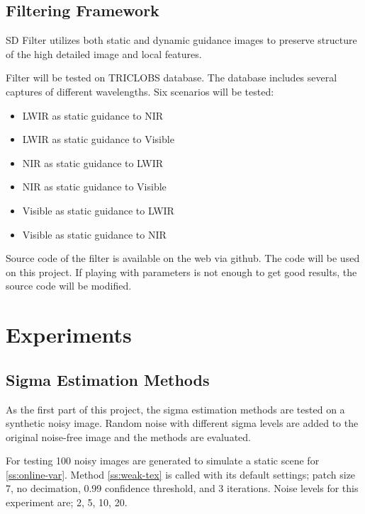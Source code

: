 \documentclass[10pt,twocolumn,letterpaper]{article}
\begin{document}
\subsection{Filtering Framework}
SD Filter\cite{ham2015} utilizes both static and dynamic guidance images to preserve structure of the high detailed image and local features.

Filter will be tested on TRICLOBS\cite{triclobs} database. The database includes several captures of different wavelengths. Six scenarios will be tested:
\begin{itemize}
	\item LWIR as static guidance to NIR
	\item LWIR as static guidance to Visible
	\item NIR as static guidance to LWIR
	\item NIR as static guidance to Visible
	\item Visible as static guidance to LWIR
	\item Visible as static guidance to NIR
\end{itemize}

Source code of the filter is available on the web via github\cite{github:sdfilter}. The code will be used on this project. If playing with parameters is not enough to get good results, the source code will be modified.

\section{Experiments}
\subsection{Sigma Estimation Methods}
As the first part of this project, the sigma estimation methods are tested on a synthetic noisy image. Random noise with different sigma levels are added to the original noise-free image and the methods are evaluated.

For testing 100 noisy images are generated to simulate a static scene for \ref{ss:online-var}. Method \ref{ss:weak-tex} is called with its default settings; patch size 7, no decimation, 0.99 confidence threshold, and 3 iterations. Noise levels for this experiment are; 2, 5, 10, 20.
\end{document}
